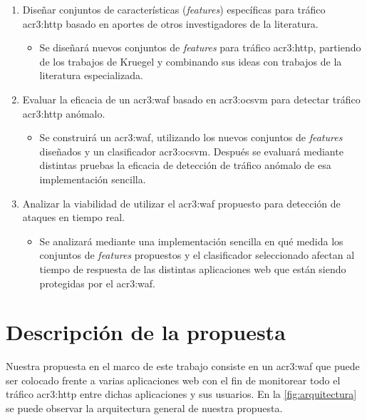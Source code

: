 \begin{enumerate}
    \item
    Diseñar conjuntos de características (\textit{features}) específicas
    para tráfico \gls{acr3:http} basado en aportes de otros investigadores
    de la literatura.

    \begin{itemize}
        \item
        Se diseñará nuevos conjuntos de \textit{features} para
        tráfico \gls{acr3:http}, partiendo de los trabajos de Kruegel
        y combinando sus ideas con trabajos de la literatura especializada.
    \end{itemize}

    \item
    Evaluar la eficacia de un \gls{acr3:waf} basado en \gls{acr3:ocsvm}
    para detectar tráfico \gls{acr3:http} anómalo.

    \begin{itemize}
        \item
        Se construirá un \gls{acr3:waf}, utilizando los nuevos conjuntos
        de \textit{features} diseñados y un clasificador \gls{acr3:ocsvm}.
        Después se evaluará mediante distintas pruebas la eficacia de
        detección de tráfico anómalo de esa implementación sencilla.
    \end{itemize}

    \item
    Analizar la viabilidad de utilizar el \gls{acr3:waf} propuesto para
    detección de ataques en tiempo real.

    \begin{itemize}
        \item
        Se analizará mediante una implementación sencilla en qué medida
        los conjuntos de \textit{features} propuestos y el clasificador
        seleccionado afectan al tiempo de respuesta de las distintas
        aplicaciones web que están siendo protegidas por el \gls{acr3:waf}.
    \end{itemize}
\end{enumerate}


\section{Descripción de la propuesta}

Nuestra propuesta en el marco de este trabajo consiste en un \gls{acr3:waf}
que puede ser colocado frente a varias aplicaciones web con el fin de
monitorear todo el tráfico \gls{acr3:http} entre dichas aplicaciones y
sus usuarios. En la \autoref{fig:arquitectura} se puede observar la
arquitectura general de nuestra propuesta.

